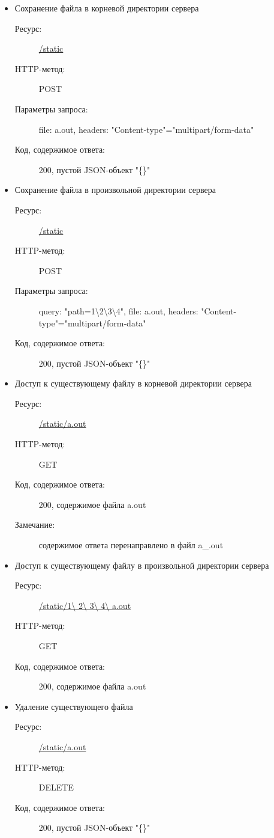 \documentclass[a4paper,12pt]{report}
\numberwithin{equation}{section}
\begin{document}
\begin{itemize}
  \item Сохранение файла в корневой директории сервера
  \begin{description}
    \item[Ресурс:] \url{/static}
    \item[HTTP-метод:] POST
    \item[Параметры запроса:] file: a.out, headers: "Content-type"="multipart/form-data"
    \item[Код, содержимое ответа:] 200, пустой JSON-объект "\{\}"
  \end{description}
  
  \item Сохранение файла в произвольной директории сервера
  \begin{description}
    \item[Ресурс:] \url{/static}
    \item[HTTP-метод:] POST
    \item[Параметры запроса:] query: "path=1\textbackslash 2\textbackslash 3\textbackslash4", file: a.out, headers: "Content-type"="multipart/form-data"
    \item[Код, содержимое ответа:] 200, пустой JSON-объект "\{\}"
  \end{description}
  
  \item Доступ к существующему файлу в корневой директории сервера
  \begin{description}
    \item[Ресурс:] \url{/static/a.out}
    \item[HTTP-метод:] GET
    \item[Код, содержимое ответа:] 200, содержимое файла a.out
    \item[Замечание:] содержимое ответа перенаправлено в файл a\_.out
  \end{description}
  
  \item Доступ к существующему файлу в произвольной директории сервера
  \begin{description}
    \item[Ресурс:] \url{/static/1\ 2\ 3\ 4\ a.out}
    \item[HTTP-метод:] GET
    \item[Код, содержимое ответа:] 200, содержимое файла a.out
  \end{description}
  
  \item Удаление существующего файла
  \begin{description}
    \item[Ресурс:] \url{/static/a.out}
    \item[HTTP-метод:] DELETE
    \item[Код, содержимое ответа:] 200, пустой JSON-объект "\{\}"
  \end{description}
  

\end{itemize}
\end{document}
